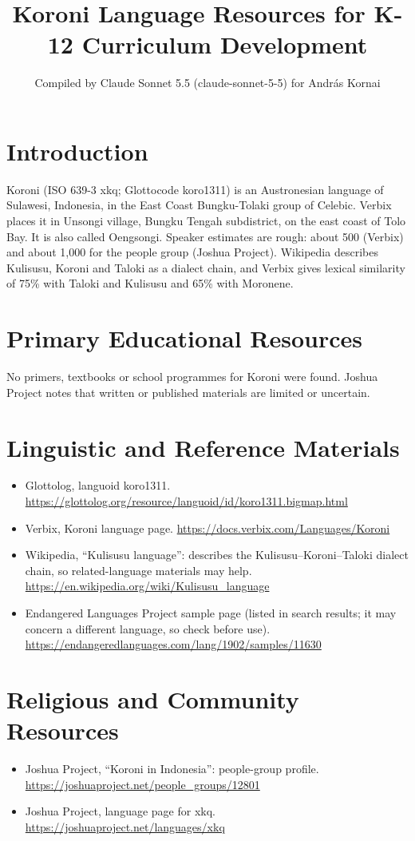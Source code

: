 \documentclass[12pt]{article}
\title{Koroni Language Resources for K-12 Curriculum Development}
\author{Compiled by Claude Sonnet 5.5 (claude-sonnet-5-5) for Andr\'as Kornai}
\date{}
\begin{document}
\maketitle

\section{Introduction}
Koroni (ISO 639-3 xkq; Glottocode koro1311) is an Austronesian language of Sulawesi, Indonesia, in the East Coast Bungku-Tolaki group of Celebic. Verbix places it in Unsongi village, Bungku Tengah subdistrict, on the east coast of Tolo Bay. It is also called Oengsongi. Speaker estimates are rough: about 500 (Verbix) and about 1,000 for the people group (Joshua Project). Wikipedia describes Kulisusu, Koroni and Taloki as a dialect chain, and Verbix gives lexical similarity of 75\% with Taloki and Kulisusu and 65\% with Moronene.

\section{Primary Educational Resources}
No primers, textbooks or school programmes for Koroni were found. Joshua Project notes that written or published materials are limited or uncertain.

\section{Linguistic and Reference Materials}
\begin{itemize}
\item Glottolog, languoid koro1311. \url{https://glottolog.org/resource/languoid/id/koro1311.bigmap.html}
\item Verbix, Koroni language page. \url{https://docs.verbix.com/Languages/Koroni}
\item Wikipedia, ``Kulisusu language'': describes the Kulisusu--Koroni--Taloki dialect chain, so related-language materials may help. \url{https://en.wikipedia.org/wiki/Kulisusu_language}
\item Endangered Languages Project sample page (listed in search results; it may concern a different language, so check before use). \url{https://endangeredlanguages.com/lang/1902/samples/11630}
\end{itemize}

\section{Religious and Community Resources}
\begin{itemize}
\item Joshua Project, ``Koroni in Indonesia'': people-group profile. \url{https://joshuaproject.net/people_groups/12801}
\item Joshua Project, language page for xkq. \url{https://joshuaproject.net/languages/xkq}
\end{itemize}
\end{document}

